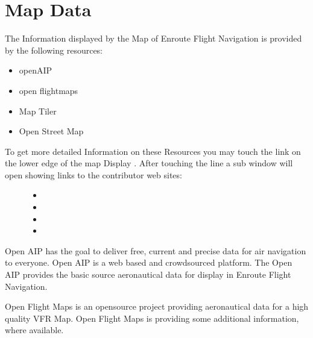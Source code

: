 \documentclass[letterpaper,10pt,english]{sphinxmanual}
\begin{document}
\chapter{Map Data}
\label{\detokenize{02-reference/map_data:map-data}}\label{\detokenize{02-reference/map_data::doc}}
The Information displayed by the Map of Enroute Flight Navigation is provided by the following resources:
\begin{itemize}
\item {} 
openAIP

\item {} 
open flightmaps

\item {} 
Map Tiler

\item {} 
Open Street Map

\end{itemize}
\begin{description}
\item[{To get more detailed Information on these Resources you may touch the link on the lower edge of the map Display . After touching the line  a sub window will open showing links to the contributor web sites:}] \leavevmode\begin{itemize}
\item {} 

\item {} 

\item {} 

\item {} 

\end{itemize}

\end{description}


Open AIP has the goal to deliver free, current and precise data for air navigation to everyone. Open AIP is a web based and crowd\sphinxhyphen{}sourced platform.
The Open AIP provides the basic source aeronautical data for display in Enroute Flight Navigation.


Open Flight Maps is an open\sphinxhyphen{}source project providing aeronautical data for a high quality VFR Map.
Open Flight Maps is providing some additional information, where available.
\end{document}
